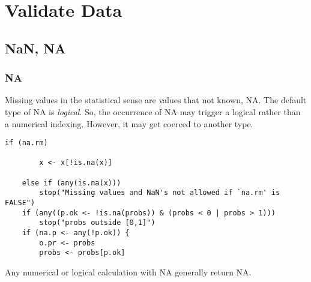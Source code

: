

\chapter{Validate Data}
\label{chap:validate-data}

\section{NaN, NA}
\label{sec:nan-na}

\subsection{NA}
\label{sec:na}


Missing values in the statistical sense are values that not known, NA.
The default type of NA is {\it logical}. So, the occurrence of NA may
trigger a logical rather than a numerical indexing. However, it may get coerced
to another type.

\begin{lstlisting}
if (na.rm)

        x <- x[!is.na(x)]

    else if (any(is.na(x)))
        stop("Missing values and NaN's not allowed if `na.rm' is FALSE")
    if (any((p.ok <- !is.na(probs)) & (probs < 0 | probs > 1))) 
        stop("probs outside [0,1]")
    if (na.p <- any(!p.ok)) {
        o.pr <- probs
        probs <- probs[p.ok]
\end{lstlisting}

Any numerical or logical calculation with NA generally return NA.


